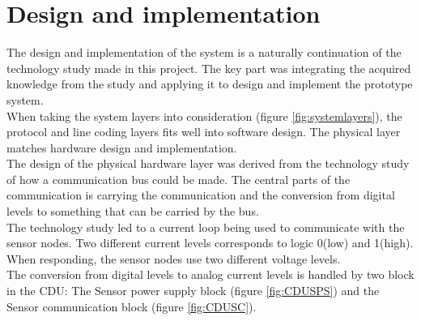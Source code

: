 \section{Design and implementation}
The design and implementation of the system is a naturally continuation of the technology study made in this project. The key part was integrating the acquired knowledge from the study and applying it to design and implement the prototype system.\\
When taking the system layers into consideration (figure \ref{fig:systemlayers}), the protocol and line coding layers fits well into software design. The physical layer matches hardware design and implementation.\\
The design of the physical hardware layer was derived from the technology study of how a communication bus could be made. The central parts of the communication is carrying the communication and the conversion from digital levels to something that can be carried by the bus.\\ 
The technology study led to a current loop being used to communicate with the sensor nodes. Two different current levels corresponds to logic 0(low) and 1(high). When responding, the sensor nodes use two different voltage levels.\\
The conversion from digital levels to analog current levels is handled by two block in the CDU: The Sensor power supply block (figure \ref{fig:CDUSPS}) and the Sensor communication block (figure \ref{fig:CDUSC}).\\
